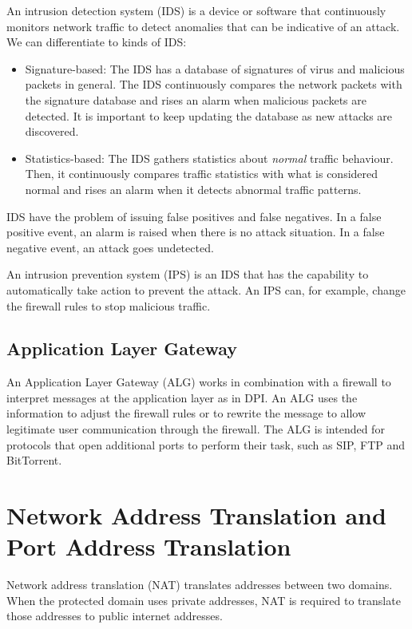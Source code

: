 An intrusion detection system (IDS) is a device or software that continuously monitors network traffic to detect anomalies that can be indicative of an attack.
We can differentiate to kinds of IDS:
\begin{itemize}
\item Signature-based: The IDS has a database of signatures of virus and malicious packets in general.
The IDS continuously compares the network packets with the signature database and rises an alarm when malicious packets are detected.
It is important to keep updating the database as new attacks are discovered.
\item Statistics-based: The IDS gathers statistics about \emph{normal} traffic behaviour.
Then, it continuously compares traffic statistics with what is considered normal and rises an alarm when it detects abnormal traffic patterns.
\end{itemize}

IDS have the problem of issuing false positives and false negatives.
In a false positive event, an alarm is raised when there is no attack situation.
In a false negative event, an attack goes undetected.

An intrusion prevention system (IPS) is an IDS that has the capability to automatically take action to prevent the attack.
An IPS can, for example, change the firewall rules to stop malicious traffic.

\subsection{Application Layer Gateway}

An Application Layer Gateway (ALG) works in combination with a firewall to interpret messages at the application layer as in DPI.
An ALG uses the information to adjust the firewall rules or to rewrite the message to allow legitimate user communication through the firewall.
The ALG is intended for protocols that open additional ports to perform their task, such as SIP, FTP and BitTorrent.

\section{Network Address Translation and Port Address Translation}

Network address translation (NAT) translates addresses between two domains.
When the protected domain uses private addresses, NAT is required to translate those addresses to public internet addresses.


